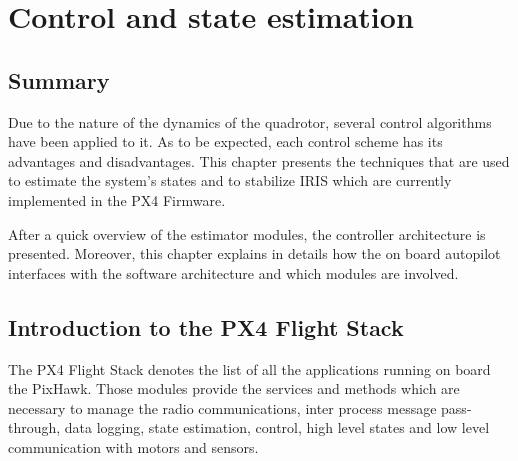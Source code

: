
\chapter{Control and state estimation}
\label{chap:fifth}
\ifpdf
    \graphicspath{{Chapter5/Figures/PNG/}{Chapter5/Figures/PDF/}{Chapter5/Figures/}}
\else
    \graphicspath{{Chapter5/Figures/EPS/}{Chapter5/Figures/}}
\fi

\section*{Summary}
Due to the nature of the dynamics of the quadrotor, several control algorithms have been applied to it. As to be expected, each control scheme has its advantages and disadvantages. This chapter presents the techniques that are used to estimate the system's states and to stabilize IRIS which are currently implemented in the PX4 Firmware.\par After a quick overview of the estimator modules, the controller architecture is presented. Moreover, this chapter explains in details how the on board autopilot interfaces with the software architecture and which modules are involved.

\section{Introduction to the PX4 Flight Stack}

The PX4 Flight Stack denotes the list of all the applications running on board the PixHawk. Those modules provide the services and methods which are necessary to manage the radio communications, inter process message pass-through, data logging, state estimation, control, high level states and low level communication with motors and sensors.

